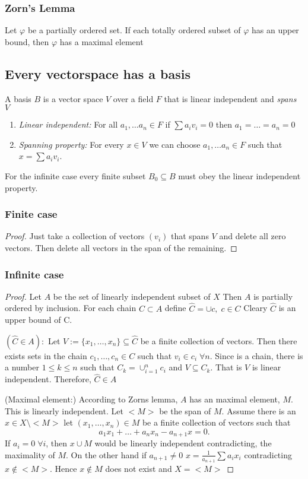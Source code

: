 \documentclass[titlepage]{article}
\begin{document}
\subsubsection{Zorn's Lemma}
Let $\varphi$ be a partially ordered set. If each totally ordered subset of $\varphi$ has an upper bound, then $\varphi$ has a maximal element


\subsection{Every vectorspace has a basis}
A basis $B$ is a vector space $V$ over a field $F$ that is linear independent and \textit{spans} $V$
\begin{enumerate}
\item \textit{Linear independent:} For all $a_1, \ldots a_n \in F$ if $\sum a_iv_i = 0$ then $a_1=\ldots = a_n = 0$
\item \textit{Spanning property:} For every $x \in V$ we can choose $a_1, \ldots a_n \in F$ such that $x = \sum a_iv_i$.
\end{enumerate}

For the infinite case every finite subset $B_0  \subseteq B$ must obey the linear independent property.
\subsubsection{
Finite case}
\begin{proof}
Just take a collection of vectors $(v_i)$ that spans $V$ and delete 
all zero vectors. Then delete all vectors in the span of the remaining.
\end{proof}
\subsubsection{Infinite case}
\begin{proof}
Let $A$ be the set of linearly independent subset of $X$ Then $A$ is partially ordered by inclusion. For each chain $C \subset A$ define $\hat{C} = \cup  c ,\; c \in C$
Cleary $\hat{C}$ is an upper bound of C.

$(\hat{C}\in A):$ Let $V:= \{x_1,\ldots, x_n\} \subseteq \hat{C}$ be a finite collection of vectors. Then there exists sets in the chain $c_1,\ldots, c_n\in C$ such that $v_i \in c_i  \;\forall n$. Since is a chain, there is a number $1\leq k \leq n$ such that $C_k =\cup_{i = 1}^n c_i$ and $V\subseteq C_k$. That is $V$ is linear independent. Therefore, $\hat{C} \in A$

(Maximal element:) According to Zorns lemma, $A$ has an maximal element, $M$. This is linearly independent. Let $<M>$ be the span of $M$. Assume there is an $x\in X\setminus<M>$ let $(x_1,\ldots, x_n)\in M$ be a finite collection of vectors such that 
\begin{equation}
a_1x_1 + \ldots + a_nx_n - a_{n+1}x = 0.
\end{equation}
If $a_{i} = 0 \; \forall i$, then $x\cup M$ would be linearly independent contradicting, the maximality of $M$. On the other hand if $a_{n+1} \neq 0$  $x = \frac{1}{a_{n+1}} \sum a_ix_i$ contradicting $x\not\in <M>$. Hence $x\not \in M$ does not exist and $X = <M>$
\end{proof}
\end{document}
